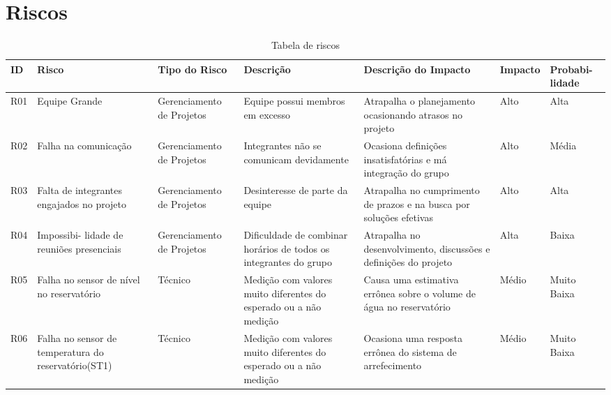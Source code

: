 \section{Riscos}

\begin{table}[!htb]
	\centering
	\begin{tabular}{|p{1.5em}|p{4.2em}|p{7em}|p{6.3em}|p{6em}|p{3.8em}|p{4.2em}|}
		\toprule
		\textbf{ID} & \textbf{Risco} & \textbf{Tipo do Risco} & \textbf{Descrição} & \textbf{Descrição do Impacto} & \textbf{Impacto} & \textbf{Probabi- lidade} \\
		\midrule
		\rowcolor[rgb]{ .851,  .851,  .851} R01   & Equipe Grande & \textcolor[rgb]{ .141,  .161,  .18}{Gerenciamento de Projetos} & Equipe possui membros em excesso & Atrapalha o planejamento ocasionando atrasos no projeto & Alto  & Alta \\
		\midrule
		R02   & Falha na comunicação & \textcolor[rgb]{ .141,  .161,  .18}{Gerenciamento de Projetos} & Integrantes não se comunicam devidamente & Ocasiona definições insatisfatórias e má integração do grupo & Alto  & Média \\
		\midrule
		\rowcolor[rgb]{ .851,  .851,  .851} R03   & Falta de integrantes engajados no projeto & \textcolor[rgb]{ .141,  .161,  .18}{Gerenciamento de Projetos} & Desinteresse de parte da equipe & Atrapalha no cumprimento de prazos e na busca por soluções efetivas & Alto  & Alta \\
		\midrule
		R04   & Impossibi- lidade de reuniões presenciais & \textcolor[rgb]{ .141,  .161,  .18}{Gerenciamento de Projetos} & Dificuldade de combinar horários de todos os integrantes do grupo & Atrapalha no desenvolvimento, discussões e definições do projeto & Alta  & Baixa \\
		\midrule
		\rowcolor[rgb]{ .851,  .851,  .851} R05   & Falha no sensor de nível no reservatório & \textcolor[rgb]{ .141,  .161,  .18}{Técnico} & Medição com valores muito diferentes do esperado ou a não medição & Causa uma estimativa errônea sobre o volume de água no reservatório & Médio & Muito Baixa \\
		\midrule
		R06   & Falha no sensor de temperatura do reservatório(ST1) & \textcolor[rgb]{ .141,  .161,  .18}{Técnico} & Medição com valores muito diferentes do esperado ou a não medição & Ocasiona uma resposta errônea do sistema de arrefecimento & Médio &  Muito Baixa \\
		\bottomrule
	\end{tabular}
	\caption{Tabela de riscos}
\end{table}

\newpage

